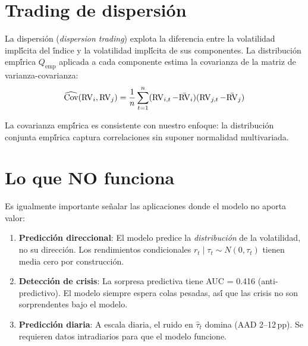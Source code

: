 \section{Trading de dispersi\'{o}n}

La dispersi\'{o}n (\emph{dispersion trading}) explota la diferencia entre la
volatilidad impl\'{\'i}cita del \'{\'i}ndice y la volatilidad impl\'{\'i}cita
de sus componentes. La distribuci\'{o}n emp\'{\'i}rica $Q_{\text{emp}}$ aplicada a
cada componente estima la covarianza de la matriz de varianza-covarianza:
\begin{equation}
    \widehat{\text{Cov}}(\operatorname{RV}_i, \operatorname{RV}_j) = \frac{1}{n} \sum_{t=1}^{n} (\operatorname{RV}_{i,t} - \bar{\operatorname{RV}}_i)(\operatorname{RV}_{j,t} - \bar{\operatorname{RV}}_j)
\end{equation}

La covarianza emp\'{\'i}rica es consistente con nuestro enfoque: la distribuci\'{o}n
conjunta emp\'{\'i}rica captura correlaciones sin suponer normalidad multivariada.

\section{Lo que NO funciona}

Es igualmente importante se\~{n}alar las aplicaciones donde el modelo no aporta valor:

\begin{enumerate}
    \item \textbf{Predicci\'{o}n direccional}: El modelo predice la
          \emph{distribuci\'{o}n} de la volatilidad, no su direcci\'{o}n.
          Los rendimientos condicionales $r_t \mid \tau_t \sim N(0, \tau_t)$
          tienen media cero por construcci\'{o}n.

    \item \textbf{Detecci\'{o}n de crisis}: La sorpresa predictiva tiene
          AUC = 0.416 (anti-predictivo). El modelo siempre espera colas pesadas,
          as\'{\'i} que las crisis no son sorprendentes bajo el modelo.

    \item \textbf{Predicci\'{o}n diaria}: A escala diaria, el ruido en $\hat{\tau}_t$
          domina (AAD 2--12\,pp). Se requieren datos intradiarios para que el
          modelo funcione.
\end{enumerate}